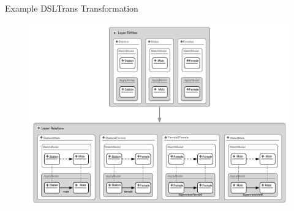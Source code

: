 \documentclass[xcolor=dvipsnames, 14pt]{beamer}
\begin{document}
\begin{frame}{Example DSLTrans Transformation}
\begin{figure}[h!]
	\centering
		\includegraphics[width=1\textwidth]{../figures/policestation_dsltrans/police_station_transformation.pdf}
	\label{fig:dsltransformation}
\end{figure}
\end{frame}
\end{document}
